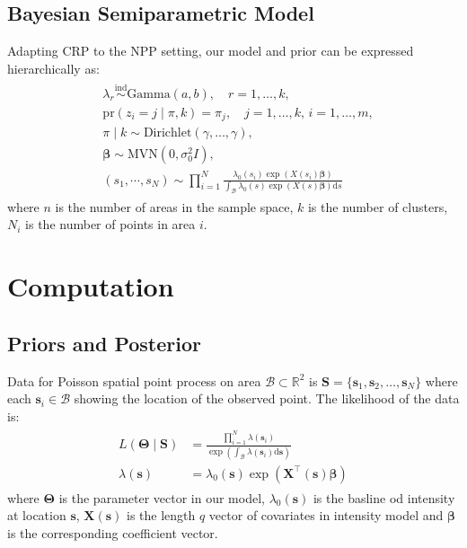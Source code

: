 \documentclass[12pt]{article}
\newcommand{\dd}{\mathrm{d}}
\begin{document}
\subsection{Bayesian Semiparametric Model}
Adapting CRP to the NPP setting, our model and prior can be expressed
hierarchically as:
\begin{align}
  \label{eq:MFMNPP}
  \begin{split}
    & \lambda_r \stackrel{\text{ind}} \sim \mbox{Gamma}(a, b), \quad
    r = 1, \ldots, k,\\
    & \mbox{pr}(z_i = j \mid \pi, k) = \pi_j, \quad j = 1, \ldots, k,
    \, i = 1, \ldots, m,\\
    & \pi \mid k \sim \mbox{Dirichlet}(\gamma, \ldots, \gamma),\\
    & \bm{\beta} \sim \mbox{MVN}(0,\sigma^2_0I),\\
    & (s_1,\cdots,s_N) \sim \prod_{i=1}^N \frac{\lambda_0(s_i)
      \exp(X(s_i)\bm{\beta})}{\int_{\mathcal{B}} \lambda_0(s)
      \exp(X(s)\bm{\beta}) \dd s}
  \end{split}
\end{align}
where $n$ is the number of areas in the sample space, $k$ is the
number of clusters, $N_i$ is the number of points in area $i$.

\section{Computation}\label{sec:bayes_comp}
\subsection{Priors and Posterior}
Data for Poisson spatial point process on area
$\mathcal{B} \subset \mathbb{R}^2$ is
$\mathbf{S} = \{\mathbf{s}_1, \mathbf{s}_2, \dots, \mathbf{s}_N\}$
where each $\mathbf{s}_i \in \mathcal {B}$ showing the location of the
observed point. The likelihood of the data is:
\begin{align*}
  \begin{split}
    L(\bm{\Theta} \mid \mathbf{S}) &= \frac{\prod_{i=1}^N
      \lambda(\mathbf{s}_i)}
    {\exp(\int_\mathcal{B}\lambda(\mathbf{s}_i)\dd \mathbf{s})}\\
    \lambda(\mathbf{s}) &=
    \lambda_0(\mathbf{s})\exp(\mathbf{X}^\top(\mathbf{s})\bm{\beta})
  \end{split}
\end{align*}
where $\bm{\Theta}$ is the parameter vector in our model,
$\lambda_0(\mathbf{s})$ is the basline od intensity at location
$\mathbf{s}$, $\mathbf{X}(\mathbf{s})$ is the length $q$ vector of
covariates in intensity model and $\bm{\beta}$ is the corresponding
coefficient vector.
\end{document}
